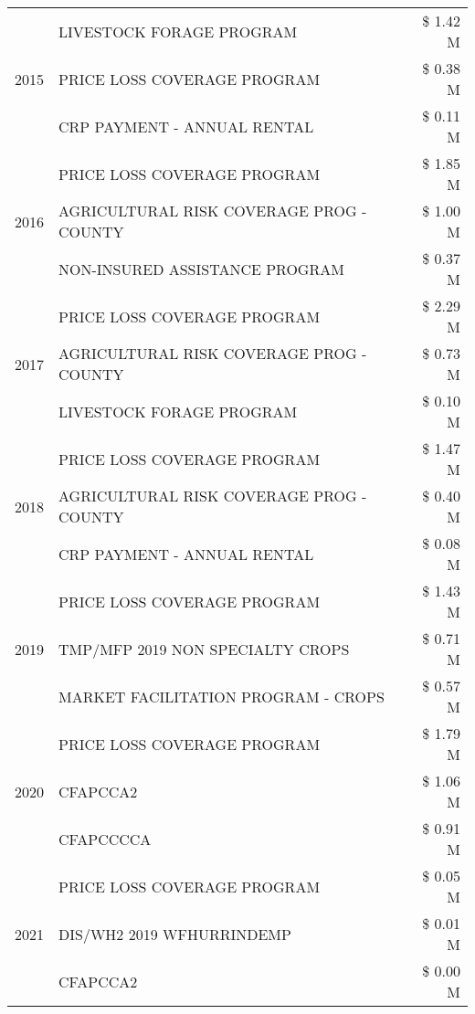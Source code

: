 \begin{tabular}{llr}
\cline{1-3}
\multirow[t]{3}{*}{2015} & LIVESTOCK FORAGE PROGRAM & \$ 1.42 M \\
 & PRICE LOSS COVERAGE PROGRAM & \$ 0.38 M \\
 & CRP PAYMENT - ANNUAL RENTAL & \$ 0.11 M \\
\cline{1-3}
\multirow[t]{3}{*}{2016} & PRICE LOSS COVERAGE PROGRAM                   & \$ 1.85 M \\
 & AGRICULTURAL RISK COVERAGE PROG - COUNTY      & \$ 1.00 M \\
 & NON-INSURED ASSISTANCE PROGRAM                & \$ 0.37 M \\
\cline{1-3}
\multirow[t]{3}{*}{2017} & PRICE LOSS COVERAGE PROGRAM & \$ 2.29 M \\
 & AGRICULTURAL RISK COVERAGE PROG - COUNTY & \$ 0.73 M \\
 & LIVESTOCK FORAGE PROGRAM & \$ 0.10 M \\
\cline{1-3}
\multirow[t]{3}{*}{2018} & PRICE LOSS COVERAGE PROGRAM & \$ 1.47 M \\
 & AGRICULTURAL RISK COVERAGE PROG - COUNTY & \$ 0.40 M \\
 & CRP PAYMENT - ANNUAL RENTAL & \$ 0.08 M \\
\cline{1-3}
\multirow[t]{3}{*}{2019} & PRICE LOSS COVERAGE PROGRAM & \$ 1.43 M \\
 & TMP/MFP 2019 NON SPECIALTY CROPS & \$ 0.71 M \\
 & MARKET FACILITATION PROGRAM - CROPS & \$ 0.57 M \\
\cline{1-3}
\multirow[t]{3}{*}{2020} & PRICE LOSS COVERAGE PROGRAM & \$ 1.79 M \\
 & CFAPCCA2 & \$ 1.06 M \\
 & CFAPCCCCA & \$ 0.91 M \\
\cline{1-3}
\multirow[t]{3}{*}{2021} & PRICE LOSS COVERAGE PROGRAM & \$ 0.05 M \\
 & DIS/WH2 2019 WFHURRINDEMP & \$ 0.01 M \\
 & CFAPCCA2 & \$ 0.00 M \\
\cline{1-3}
\bottomrule
\end{tabular}
